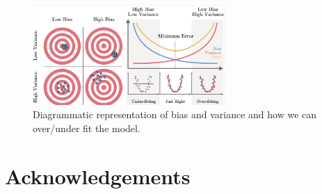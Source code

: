 \documentclass[11pt]{article}
\begin{document}
\begin{figure}
\centering 
\includegraphics[width=0.65\textwidth]{cartoon1.png}
\caption{\label{fig:bias1}Diagrammatic representation of bias and variance and how we can over/under fit the model.}
\end{figure}




\section{Acknowledgements}


\appendix  
	
	\newpage
	
	
\end{document}
